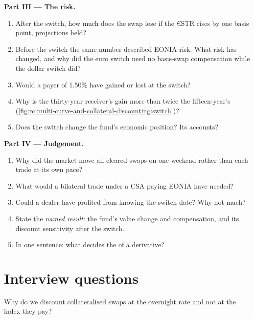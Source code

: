 \begin{problem}
\medskip\noindent\textbf{Part III --- The risk.}
\begin{enumerate}[resume]
\item After the switch, how much does the swap lose if the €STR 
rises by one basis point, projections held?
\item Before the switch the same number described EONIA risk. What risk has
changed, and why did the euro switch need no basis-swap compensation while the
dollar switch did?
\item Would a payer of 1.50\% have gained or lost at the switch?
\item Why is the thirty-year receiver's gain more than twice the fifteen-year's
(\cref{fig:rc:multi-curve-and-collateral-discounting:switch})?
\item Does the switch change the fund's economic position? Its accounts?
\end{enumerate}

\medskip\noindent\textbf{Part IV --- Judgement.}
\begin{enumerate}[resume]
\item Why did the market move all cleared swaps on one weekend rather than
each trade at its own pace?
\item What would a bilateral trade under a CSA paying EONIA have needed?
\item Could a dealer have profited from knowing the switch date? Why not much?
\item State the \emph{named result}: the fund's value change and compensation,
and its discount sensitivity after the switch.
\item In one sentence: what decides the  of a derivative?
\end{enumerate}
\end{problem}

\section{Interview questions}

\begin{interviewq}\label{iq:rc:multi-curve-and-collateral-discounting:1}
Why do we discount collateralised swaps at the overnight rate and not at the
index they pay?
\end{interviewq}

